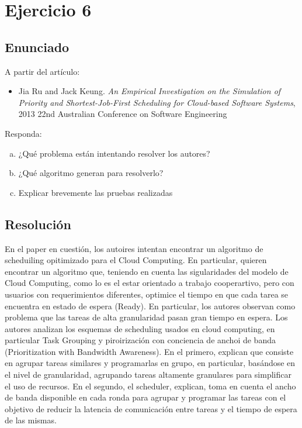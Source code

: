\section{Ejercicio 6}

\subsection{Enunciado}
A partir del artículo:

\begin{itemize}
\item Jia Ru and Jack Keung. \textit{An Empirical Investigation on the Simulation of Priority and Shortest-Job-First Scheduling for Cloud-based Software Systems}, 2013 22nd Australian Conference on Software Engineering
\end{itemize}

Responda:

\begin{enumerate}[a)]
\item ¿Qué problema están intentando resolver los autores?
\item ¿Qué algoritmo generan para resolverlo?
\item Explicar brevemente las pruebas realizadas
\end{enumerate}

\subsection{Resolución}
En el paper en cuestión, los autoires intentan encontrar un algoritmo de scheduiling opitimizado para el Cloud Computing. En particular, quieren encontrar un algoritmo que, teniendo en cuenta las sigularidades del modelo de Cloud Computing, como lo es el estar orientado a trabajo cooperartivo, pero con usuarios con requerimientos diferentes, optimice el tiempo en que cada tarea se encuentra en estado de espera (Ready). En particular, los autores observan como problema que las tareas de alta granularidad pasan gran tiempo en espera.
Los autores analizan los esquemas de scheduling usados en cloud computing, en particular Task Grouping y piroirización con conciencia de anchoi de banda (Prioritization  with Bandwidth Awareness). En el primero, explican que consiste en agrupar tareas similares y programarlas en grupo, en particular, basándose en el nivel de granularidad, agrupando tareas altamente granulares para simplificar el uso de recursos. En el segundo, el scheduler, explican, toma en cuenta el ancho de banda disponible en cada ronda para agrupar y programar las tareas con el objetivo de reducir la latencia de comunicación entre tareas y el tiempo de espera de las mismas.

